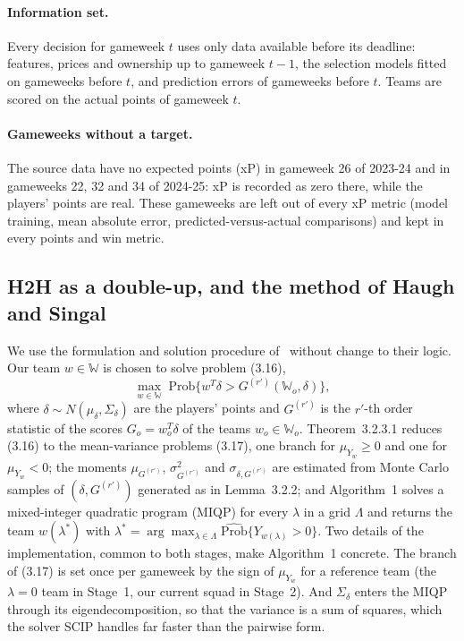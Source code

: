 \paragraph{Information set.} Every decision for gameweek $t$ uses only data available before
its deadline: features, prices and ownership up to gameweek $t-1$, the selection models fitted
on gameweeks before $t$, and prediction errors of gameweeks before $t$. Teams are scored on the
actual points of gameweek $t$.

\paragraph{Gameweeks without a target.} The source data have no expected points (xP) in
gameweek 26 of 2023-24 and in gameweeks 22, 32 and 34 of 2024-25: xP is recorded as zero there,
while the players' points are real. These gameweeks are left out of every xP metric (model
training, mean absolute error, predicted-versus-actual comparisons) and kept in every points and
win metric.

\subsection{H2H as a double-up, and the method of Haugh and Singal}
\label{sec:design-method}

We use the formulation and solution procedure of~\cite{haugh2021} without change to their
logic. Our team $w \in \mathbb{W}$ is chosen to solve problem (3.16),
\[
  \max_{w\in\mathbb{W}} \; \mathrm{Prob}\bigl\{ w^{T}\delta > G^{(r')}(\mathbb{W}_o,\delta) \bigr\},
\]
where $\delta \sim N(\mu_\delta,\Sigma_\delta)$ are the players' points and $G^{(r')}$ is the
$r'$-th order statistic of the scores $G_o = w_o^{T}\delta$ of the teams $w_o\in\mathbb{W}_o$.
Theorem~3.2.3.1 reduces (3.16) to the mean-variance problems (3.17), one branch for
$\mu_{Y_w}\ge 0$ and one for $\mu_{Y_w}<0$; the moments $\mu_{G^{(r')}}$,
$\sigma^2_{G^{(r')}}$ and $\sigma_{\delta,G^{(r')}}$ are estimated from Monte Carlo samples
of $(\delta,G^{(r')})$ generated as in Lemma~3.2.2; and Algorithm~1 solves a mixed-integer
quadratic program (MIQP) for every $\lambda$ in a grid $\Lambda$ and returns the team $w(\lambda^*)$
with $\lambda^* = \arg\max_{\lambda\in\Lambda}\widehat{\mathrm{Prob}}\{Y_{w(\lambda)}>0\}$.
Two details of the implementation, common to both stages, make Algorithm~1 concrete. The branch
of (3.17) is set once per gameweek by the sign of $\mu_{Y_w}$ for a reference team (the
$\lambda=0$ team in Stage~1, our current squad in Stage~2). And $\Sigma_\delta$ enters the MIQP
through its eigendecomposition, so that the variance is a sum of squares, which the solver SCIP
handles far faster than the pairwise form.

